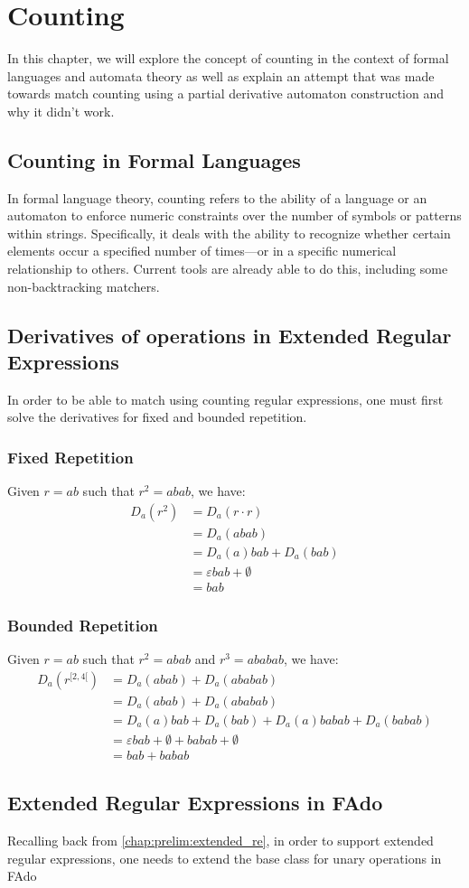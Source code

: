 \chapter{Counting}\label{chap:counting}
In this chapter, we will explore the concept of counting in the context of formal languages and automata theory as well as explain an attempt that was made towards match counting using a partial derivative automaton construction and why it didn't work.

\section{Counting in Formal Languages}
In formal language theory, counting refers to the ability of a language or an automaton to enforce numeric constraints over the number of symbols or patterns within strings. Specifically, it deals with the ability to recognize whether certain elements occur a specified number of times—or in a specific numerical relationship to others.
Current tools are already able to do this, including some non-backtracking matchers.

\section{Derivatives of operations in Extended Regular Expressions}
In order to be able to match using counting regular expressions, one must first solve the derivatives for fixed and bounded repetition.

\subsection{Fixed Repetition}
Given $r = ab$ such that $r^2 = abab$, we have:
\begin{align*}
	D_a(r^2) &= D_a(r \cdot r) \\
	&= D_a(abab)  \\
	&= D_a(a)bab + D_a(bab) \\
	&= \varepsilon bab + \emptyset \\
	&= bab
\end{align*}


\subsection{Bounded Repetition}
Given $r = ab$ such that $r^2 = abab$ and $r^3 = ababab$, we have:
\begin{align*}
	D_a(r^{[2,4[}) &= D_a(abab) + D_a(ababab) \\
	&= D_a(abab) + D_a(ababab) \\
	&= D_a(a)bab + D_a(bab) + D_a(a)babab + D_a(babab) \\
	&= \varepsilon bab + \emptyset + babab + \emptyset \\
	&= bab + babab
\end{align*}

\section{Extended Regular Expressions in FAdo}
Recalling back from \ref{chap:prelim:extended_re}, in order to support extended regular expressions, one needs to extend the base class for unary operations in FAdo